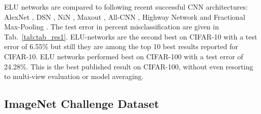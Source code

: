 \documentclass{article}
\begin{document}
ELU networks are compared to following
recent successful CNN
architectures: AlexNet \citep{Krizhevsky:12}, DSN \citep{Lee:15},
NiN \citep{Min:13}, Maxout \citep{Goodfellow:13},
All-CNN \citep{Springenberg:14}, Highway Network \citep{Srivastava:15}
and Fractional Max-Pooling \citep{Graham:14}.
The test error in percent misclassification are given in Tab.~\ref{tab:tab_res1}.
ELU-networks are the second best on CIFAR-10 with a test error of
6.55\% but still they are among the top 10 best results reported for CIFAR-10.
ELU networks performed best on CIFAR-100 with a test error of 24.28\%.
This is the best published result on CIFAR-100,
without even resorting to multi-view evaluation or model averaging.


\subsection{ImageNet Challenge Dataset}
\label{sec:ImageNet}
\end{document}
